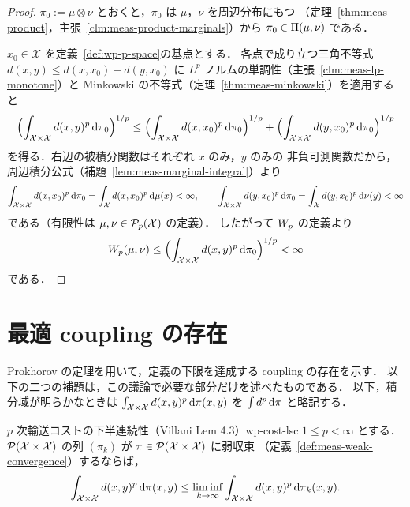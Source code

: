 \begin{proof}
  $\pi_0:=\mu\otimes\nu$ とおくと，$\pi_0$ は $\mu$，$\nu$ を周辺分布にもつ
  （定理~\ref{thm:meas-product}，主張~\ref{clm:meas-product-marginals}）から
  $\pi_0\in\Pi(\mu,\nu)$ である．

  $x_0\in\mathcal{X}$ を定義~\ref{def:wp-p-space}の基点とする．
  各点で成り立つ三角不等式 $d(x,y)\leq d(x,x_0)+d(y,x_0)$ に
  $L^p$ ノルムの単調性（主張~\ref{clm:meas-lp-monotone}）と
  Minkowski の不等式（定理~\ref{thm:meas-minkowski}）を適用すると
  \[
    \Bigl(\int_{\mathcal{X}\times\mathcal{X}}d(x,y)^p\,\mathrm{d}\pi_0\Bigr)^{1/p}
    \leq
    \Bigl(\int_{\mathcal{X}\times\mathcal{X}}d(x,x_0)^p\,\mathrm{d}\pi_0\Bigr)^{1/p}
    +\Bigl(\int_{\mathcal{X}\times\mathcal{X}}d(y,x_0)^p\,\mathrm{d}\pi_0\Bigr)^{1/p}
  \]
  を得る．右辺の被積分関数はそれぞれ $x$ のみ，$y$ のみの
  非負可測関数だから，周辺積分公式（補題~\ref{lem:meas-marginal-integral}）より
  \[
    \int_{\mathcal{X}\times\mathcal{X}}d(x,x_0)^p\,\mathrm{d}\pi_0
    =\int_{\mathcal{X}}d(x,x_0)^p\,\mathrm{d}\mu(x)<\infty,
    \qquad
    \int_{\mathcal{X}\times\mathcal{X}}d(y,x_0)^p\,\mathrm{d}\pi_0
    =\int_{\mathcal{X}}d(y,x_0)^p\,\mathrm{d}\nu(y)<\infty
  \]
  である（有限性は $\mu,\nu\in\mathcal{P}_{p}(\mathcal{X})$ の定義）．
  したがって $W_p$ の定義より
  \[
    W_p(\mu,\nu)
    \leq
    \Bigl(\int_{\mathcal{X}\times\mathcal{X}}d(x,y)^p\,\mathrm{d}\pi_0\Bigr)^{1/p}
    <\infty
  \]
  である．
\end{proof}

\section{最適 coupling の存在}
\label{sec:wp-existence}

Prokhorov の定理を用いて，定義の下限を達成する coupling の存在を示す．
以下の二つの補題は，この議論で必要な部分だけを述べたものである．
以下，積分域が明らかなときは
$\int_{\mathcal{X}\times\mathcal{X}}d(x,y)^p\,\mathrm{d}\pi(x,y)$ を
$\int d^p\,\mathrm{d}\pi$ と略記する．

\begin{lemma}{$p$ 次輸送コストの下半連続性（Villani Lem 4.3）}{wp-cost-lsc}
  $1\leq p<\infty$ とする．
  $\mathcal{P}(\mathcal{X}\times\mathcal{X})$ の列 $(\pi_k)$ が
  $\pi\in\mathcal{P}(\mathcal{X}\times\mathcal{X})$ に弱収束
  （定義~\ref{def:meas-weak-convergence}）するならば，
  \[
    \int_{\mathcal{X}\times\mathcal{X}}d(x,y)^p\,\mathrm{d}\pi(x,y)
    \leq
    \liminf_{k\to\infty}
    \int_{\mathcal{X}\times\mathcal{X}}d(x,y)^p\,\mathrm{d}\pi_k(x,y).
  \]
\end{lemma}

